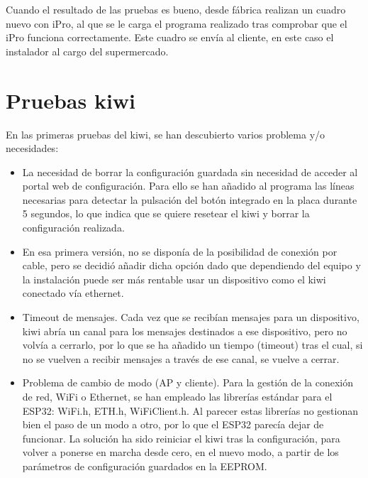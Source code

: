 Cuando el resultado de las pruebas es bueno, desde fábrica realizan un cuadro nuevo con iPro, al que se le carga el programa realizado tras comprobar que el iPro funciona correctamente. Este cuadro se envía al cliente, en este caso el instalador al cargo del supermercado.


\section{Pruebas kiwi}
\label{sec:pruebasKiwi}

En las primeras pruebas del kiwi, se han descubierto varios problema y/o necesidades:

\begin{itemize}
  \item La necesidad de borrar la configuración guardada sin necesidad de acceder al portal web de configuración. Para ello se han añadido al programa las líneas necesarias para detectar la pulsación del botón integrado en la placa durante 5 segundos, lo que indica que se quiere resetear el kiwi y borrar la configuración realizada.
  \item En esa primera versión, no se disponía de la posibilidad de conexión por cable, pero se decidió añadir dicha opción dado que dependiendo del equipo y la instalación puede ser más rentable usar un dispositivo como el kiwi conectado vía ethernet.
  \item Timeout de mensajes. Cada vez que se recibían mensajes para un dispositivo, kiwi abría un canal para los mensajes destinados a ese dispositivo, pero no volvía a cerrarlo, por lo que se ha añadido un tiempo (timeout) tras el cual, si no se vuelven a recibir mensajes a través de ese canal, se vuelve a cerrar. 
  \item Problema de cambio de modo (AP y cliente). Para la gestión de la conexión de red, WiFi o Ethernet, se han empleado las librerías estándar para el ESP32: WiFi.h, ETH.h, WiFiClient.h. Al parecer estas librerías no gestionan bien el paso de un modo a otro, por lo que el ESP32 parecía dejar de funcionar. La solución ha sido reiniciar el kiwi tras la configuración, para volver a ponerse en marcha desde cero, en el nuevo modo, a partir de los parámetros de configuración guardados en la EEPROM.

\end{itemize}
